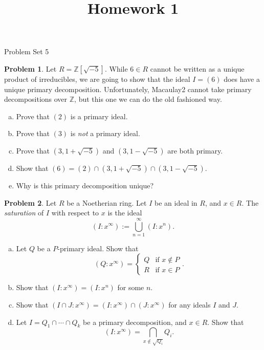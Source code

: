 \documentclass[11pt]{article}
\title{}
\date{\vspace{-0.5in}}
\title{Homework 1}
\theoremstyle{definition}
\newtheorem{problem}{Problem}
\begin{document}
\thispagestyle{fancy}
\pagestyle{fancy}


\begin{center}
	{\LARGE Problem Set 5}
\end{center}


\begin{problem}
	Let $R = \mathbb{Z}[\sqrt{-5}]$. While $6 \in R$ cannot be written as a unique product of irreducibles, we are going to show that the ideal $I = (6)$ does have a unique primary decomposition. Unfortunately, Macaulay2 cannot take primary decompositions over $\mathbb{Z}$, but this one we can do the old fashioned way.	
	\begin{enumerate}[a)]
	\item Prove that $(2)$ is a primary ideal.
	\item Prove that $(3)$ is \emph{not} a primary ideal.
	\item Prove that $(3, 1+\sqrt{-5})$ and $(3, 1-\sqrt{-5})$ are both primary.
	\item Show that $(6) = (2) \cap (3, 1+\sqrt{-5}) \cap (3, 1 -\sqrt{-5})$.
	\item Why is this primary decomposition unique?
	\end{enumerate}
\end{problem}


\begin{problem} Let $R$ be a Noetherian ring. Let $I$ be an ideal in $R$, and $x \in R$. The \emph{saturation} of $I$ with respect to $x$ is the ideal
$$(I : x^\infty) := \bigcup_{n=1}^\infty (I : x^n).$$
	\begin{enumerate}[a)]
	\item Let $Q$ be a $P$-primary ideal. Show that
	$$(Q : x^\infty) = \left\lbrace \begin{array}{ll} Q & \textrm{if } x \notin P \\ R & \textrm{if } x \in P \end{array}\right. .$$
	\item Show that $(I : x^\infty) = (I : x^n)$ for some $n$.
	\item Show that $(I \cap J : x^\infty) = (I : x^\infty) \cap (J : x^\infty)$ for any ideals $I$ and $J$.
	\item Let $I = Q_1 \cap \cdots \cap Q_k$ be a primary decomposition, and $x \in R$. Show that
	$$(I : x^\infty) = \bigcap_{x \notin \sqrt{Q_i}} Q_i.$$
	\end{enumerate}
\end{problem}
\end{document}
